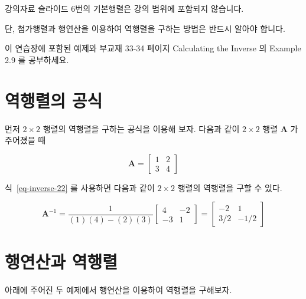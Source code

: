 \documentclass[
  11pt,
  a4paper,
  oneside]{scrbook}
\theoremstyle{definition}
\theoremstyle{definition}
\theoremstyle{plain}
\theoremstyle{remark}
\begin{document}
\begin{tcolorbox}[enhanced jigsaw, colback=white, colframe=quarto-callout-important-color-frame, opacityback=0, toprule=.15mm, leftrule=.75mm, titlerule=0mm, opacitybacktitle=0.6, title=\textcolor{quarto-callout-important-color}{\faExclamation}\hspace{0.5em}{중요}, colbacktitle=quarto-callout-important-color!10!white, breakable, bottomrule=.15mm, bottomtitle=1mm, toptitle=1mm, arc=.35mm, left=2mm, rightrule=.15mm, coltitle=black]

강의자료 슬라이드 6번의 기본행렬은 강의 범위에 포함되지 않습니다.

단, 첨가행렬과 행연산을 이용하여 역행렬을 구하는 방법은 반드시 알아야
합니다.

이 연습장에 포함된 예제와 부교재 33-34 페이지 Calculating the Inverse 의
Example 2.9 를 공부하세요.

\end{tcolorbox}

\section{역행렬의 공식}\label{uxc5eduxd589uxb82cuxc758-uxacf5uxc2dd}

먼저 \(2 \times 2\) 행렬의 역행렬을 구하는 공식을 이용해 보자. 다음과
같이 \(2 \times 2\) 행렬 \(\pmb A\) 가 주어졌을 때

\[
\pmb  A =
\begin{bmatrix}
1 & 2 \\
3 & 4
\end{bmatrix}
\]

식~\ref{eq-inverse-22} 를 사용하면 다음과 같이 \(2 \times 2\) 행렬의
역행렬을 구할 수 있다.

\[ \pmb A^{-1} = \frac{1}{(1)(4)-(2)(3) }
\begin{bmatrix}
4 & -2 \\
-3 & 1
\end{bmatrix}
=
\begin{bmatrix}
-2 & 1 \\
3/2 & -1/2
\end{bmatrix}
\]

\section{행연산과
역행렬}\label{uxd589uxc5f0uxc0b0uxacfc-uxc5eduxd589uxb82c}

아래에 주어진 두 예제에서 행연산을 이용하여 역행렬을 구해보자.
\end{document}
